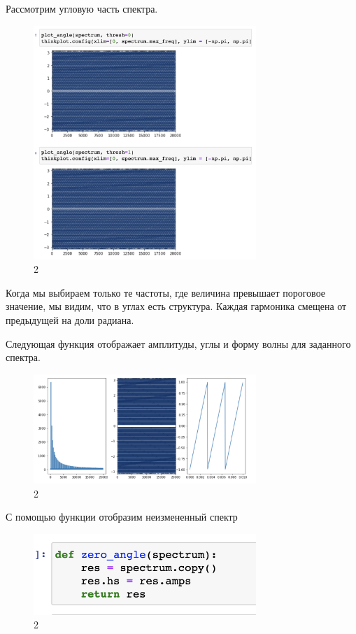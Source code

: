 \documentclass[10pt,a4paper,oneside]{article}
\begin{document}
Рассмотрим угловую часть спектра.

\begin{figure}[H]
        \centering
        \includegraphics[width=0.75\textwidth]{pics/13.png}
        \caption{2}
        \label{fig:first}
\end{figure}

Когда мы выбираем только те частоты, где величина превышает пороговое значение, мы видим, что в углах есть структура. Каждая гармоника смещена от предыдущей на доли радиана.

Следующая функция отображает амплитуды, углы и форму волны для заданного спектра.

\begin{figure}[H]
        \centering
        \includegraphics[width=0.75\textwidth]{pics/14.png}
        \caption{2}
        \label{fig:first}
\end{figure}

С помощью функции отобразим неизмененный спектр

\begin{figure}[H]
        \centering
        \includegraphics[width=0.75\textwidth]{pics/15.png}
        \caption{2}
        \label{fig:first}
\end{figure}
\end{document}
